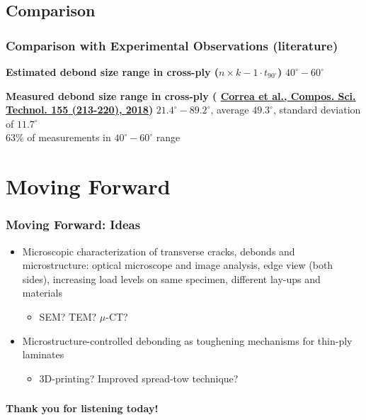 \documentclass[first,firstsupp,lastsupp,last,hyperref,table]{ETHclass}
\begin{document}
\subsection{Comparison}

\begin{frame}
\frametitle{\vspace{0.2cm}\small Comparison with Experimental Observations (literature)}
\vspace{-0.5cm}
\centering
\scriptsize
\begin{alertblock}{\centering\scriptsize\bf Estimated debond size range in cross-ply ($n\times k-1\cdot t_{90^{\circ}}$)}
\centering
$40^{\circ}-60^{\circ}$
\end{alertblock}
\pgfmathsetmacro{}
\pgfmathsetmacro{}
\begin{alertblock}{\centering\scriptsize\bf Measured debond size range in cross-ply ({\fontsize{\fontsizeref}{\stretchref} \selectfont \href{https://doi.org/10.1016/j.compscitech.2017.12.009}{Correa et al., Compos. Sci. Technol. \textbf{155} (213-220), 2018}})}
\centering
$21.4^{\circ}-89.2^{\circ}$, average $49.3^{\circ}$, standard deviation of $11.7^{\circ}$\\ $63\%$ of measurements in $40^{\circ}-60^{\circ}$ range
\end{alertblock}
\end{frame}

\section{Moving Forward}

\begin{frame}
\frametitle{Moving Forward: Ideas}
\vspace{-0.5cm}
\footnotesize
\centering
\begin{itemize}[label=$\RHD$]
\item Microscopic characterization of transverse cracks, debonds and microstructure: optical microscope and image analysis, edge view (both sides), increasing load levels on same specimen, different lay-ups and materials\\[7.5pt]
\begin{itemize}[label=]
\item SEM? TEM? $\mu$-CT?\\[20pt]
\end{itemize}
\item Microstructure-controlled debonding as toughening mechanisms for thin-ply laminates\\[7.5pt]
\begin{itemize}[label=]
\item 3D-printing? Improved spread-tow technique?
\end{itemize}
\end{itemize}
\end{frame}

\begin{frame}
\frametitle{}
\centering
\vspace{0.5cm}
\LARGE
\textbf{Thank you for listening today!}
\end{frame}

\begin{frame}[plain]
\frametitle{}
\end{frame}
\end{document}
